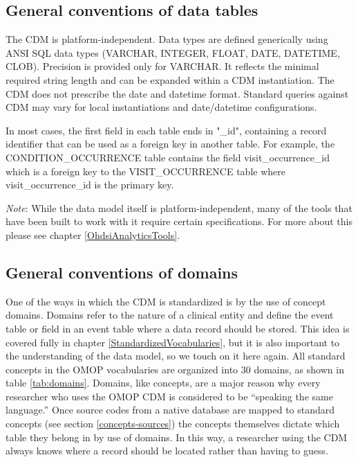 \documentclass[11pt]{book}
\theoremstyle{definition}
\theoremstyle{definition}
\theoremstyle{definition}
\theoremstyle{remark}
\begin{document}
\hypertarget{general-conventions-of-data-tables}{%
\subsection{General conventions of data tables}\label{general-conventions-of-data-tables}}

The CDM is platform-independent. Data types are defined generically using ANSI SQL data types (VARCHAR, INTEGER, FLOAT, DATE, DATETIME, CLOB). Precision is provided only for VARCHAR. It reflects the minimal required string length and can be expanded within a CDM instantiation. The CDM does not prescribe the date and datetime format. Standard queries against CDM may vary for local instantiations and date/datetime configurations.

In most cases, the first field in each table ends in "\_id", containing a record identifier that can be used as a foreign key in another table. For example, the CONDITION\_OCCURRENCE table contains the field visit\_occurrence\_id which is a foreign key to the VISIT\_OCCURRENCE table where visit\_occurrence\_id is the primary key.

\emph{Note}: While the data model itself is platform-independent, many of the tools that have been built to work with it require certain specifications. For more about this please see chapter \ref{OhdsiAnalyticsTools}.

\hypertarget{general-conventions-of-domains}{%
\subsection{General conventions of domains}\label{general-conventions-of-domains}}

One of the ways in which the CDM is standardized is by the use of concept domains. Domains refer to the nature of a clinical entity and define the event table or field in an event table where a data record should be stored. This idea is covered fully in chapter \ref{StandardizedVocabularies}, but it is also important to the understanding of the data model, so we touch on it here again. All standard concepts in the OMOP vocabularies are organized into 30 domains, as shown in table \ref{tab:domains}. Domains, like concepts, are a major reason why every researcher who uses the OMOP CDM is considered to be ``speaking the same language.'' Once source codes from a native database are mapped to standard concepts (see section \ref{concepts-sources}) the concepts themselves dictate which table they belong in by use of domains. In this way, a researcher using the CDM always knows where a record should be located rather than having to guess.
\end{document}
